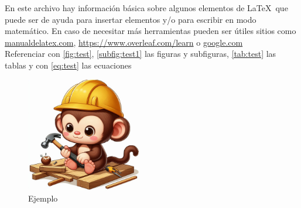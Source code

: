 

En este archivo hay información básica sobre algunos elementos de \LaTeX\, que puede ser de ayuda para insertar elementos y/o para escribir en modo matemático. En caso de necesitar más herramientas pueden ser útiles sitios como \url{manualdelatex.com}, \url{https://www.overleaf.com/learn} o \url{google.com}\\


 Referenciar con \autoref{fig:test}, \autoref{subfig:test1} las figuras y subfiguras, \autoref{tab:test} las tablas y con \eqref{eq:test} las ecuaciones

\begin{figure}[H]
  \centering
   \includegraphics[height = 5cm]{imagenes/test1.jpeg}
   \caption{Ejemplo}
   \label{fig:test}
\end{figure}

